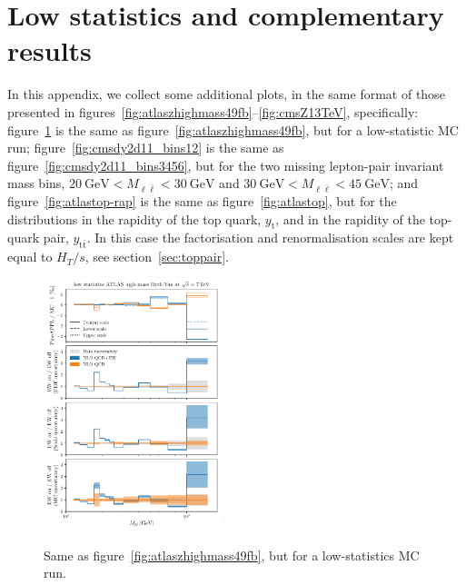\section{Low statistics and complementary results}
\label{app:add_plots}

In this appendix, we collect some additional plots, in the same format of those
presented in figures~\ref{fig:atlaszhighmass49fb}--\ref{fig:cmsZ13TeV},
specifically: figure~\ref{fig:atlaszhighmass49fb-lowstat} is the same as
figure~\ref{fig:atlaszhighmass49fb}, but for a low-statistic MC run;
figure~\ref{fig:cmsdy2d11_bins12} is the same as
figure~\ref{fig:cmsdy2d11_bins3456}, but for the two missing lepton-pair
invariant mass bins,
$\SI{20}{\giga\electronvolt}<M_{\ell\bar\ell}<\SI{30}{\giga\electronvolt}$ and
$\SI{30}{\giga\electronvolt}<M_{\ell\bar\ell}<\SI{45}{\giga\electronvolt}$;
and figure~\ref{fig:atlastop-rap} is the same as figure~\ref{fig:atlastop},
but for the distributions in the rapidity of the top quark, $y_{\mathrm{t}}$,
and in the rapidity of the top-quark pair, $y_{\mathrm{t}\bar{\mathrm{t}}}$. In this
case the factorisation and renormalisation scales are kept equal to
$H_T/s$, see section~\ref{sec:toppair}.

\begin{figure}[!t]
    \centering
    \includegraphics[width=0.46\textwidth]{figures/pineappl_ATLASZHIGHMASS49FB_lowstat}\\
    \caption{Same as figure~\ref{fig:atlaszhighmass49fb}, but for a
    low-statistics MC run.}
    \label{fig:atlaszhighmass49fb-lowstat}
\end{figure}

